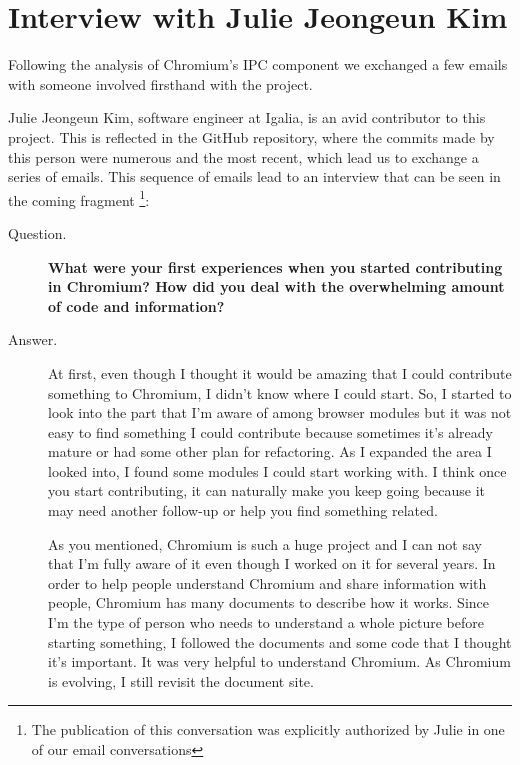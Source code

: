 \chapter{Interview with Julie Jeongeun Kim}
\label{chap:interview}

Following the analysis of Chromium's IPC component we exchanged a few emails with someone involved firsthand with the project. 

Julie Jeongeun Kim, software engineer at Igalia, is an avid contributor to this project. This is reflected in the GitHub repository, where the commits made by this person were numerous and the most recent, which lead us to exchange a series of emails. This sequence of emails lead to an interview that can be seen in the coming fragment \footnote{The publication of this conversation was explicitly authorized by Julie in one of our email conversations}: 


\begin{description}

\item[Question.] \textbf{What were your first experiences when you started contributing in Chromium? How did you deal with the overwhelming amount of code and information?}

\item[Answer.] At first, even though I thought it would be amazing that I could contribute something to Chromium, I didn't know where I could start. So, I started to look into the part that I'm aware of among browser modules but it was not easy to find something I could contribute because sometimes it's already mature or had some other plan for refactoring. As I expanded the area I looked into, I found some modules I could start working with. I think once you start contributing, it can naturally make you keep going because it may need another follow-up or help you find something related.

As you mentioned, Chromium is such a huge project and I can not say that I'm fully aware of it even though I worked on it for several years. In order to help people understand Chromium and share information with people, Chromium has many documents to describe how it works. Since I'm  the type of person who needs to understand a whole picture before starting something, I followed the documents and some code that I thought it's important. It was very helpful to understand Chromium. As Chromium is evolving, I still revisit the document site.
\bigbreak \bigbreak
\end{description}

